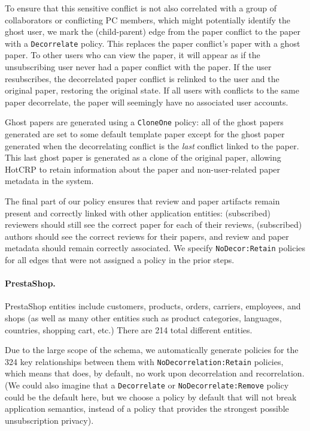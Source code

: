 To ensure that this sensitive conflict is not also correlated with a group of collaborators or conflicting PC
members, which might potentially identify the ghost user, we mark the (child-parent) edge from
the paper conflict to the paper with a \texttt{Decorrelate} policy. This replaces the paper conflict's
paper with a ghost paper.
To other users who can view the paper, it will appear as if the unsubscribing
user never had a paper conflict with the paper.
If the user resubscribes, the decorrelated paper conflict is relinked to the user and the original
paper, restoring the original state.  If all users with conflicts to the same paper decorrelate, the
paper will seemingly have no associated user accounts.

Ghost papers are generated using a \texttt{CloneOne} policy: all of the ghost papers generated are
set to some default template paper except for the ghost paper generated when the decorrelating
conflict is the \emph{last} conflict linked to the paper. This last ghost paper is generated as a
clone of the original paper, allowing HotCRP to retain information about the paper and
non-user-related paper metadata in the system.

The final part of our policy ensures that review and paper artifacts remain present and
correctly linked with other application entities: (subscribed) reviewers should still see the correct paper for each of
their reviews, (subscribed) authors should see the correct reviews for their papers, and review and
paper metadata should remain correctly associated. We specify
\texttt{NoDecor:Retain} policies for all edges that were not assigned a policy in the prior
steps.

\paragraph{PrestaShop.}
PrestaShop entities include customers, products, orders, carriers, employees, and shops (as well as
many other entities such as product categories, languages, countries, shopping cart, etc.) There are
214 total different entities.

Due to the large scope of the schema, we automatically generate policies for the 324 key relationships between them
with \texttt{NoDecorrelation:Retain} policies, which means that \sys does, by default, no work upon
decorrelation and recorrelation. (We could also imagine that a \texttt{Decorrelate} or
\texttt{NoDecorrelate:Remove} policy could be
the default here, but we choose a policy by default that will not break application semantics,
instead of a policy that provides the strongest possible unsubscription privacy).

